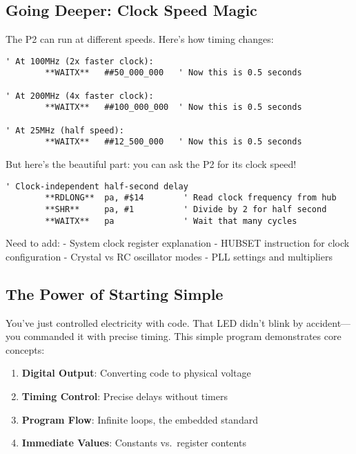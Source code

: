 \documentclass[11pt]{book}
\providecommand{\tightlist}{%
  \setlength{\itemsep}{0pt}\setlength{\parskip}{0pt}}
\begin{document}
\hypertarget{going-deeper-clock-speed-magic}{%
\subsection{Going Deeper: Clock Speed
Magic}\label{going-deeper-clock-speed-magic}}

The P2 can run at different speeds. Here's how timing changes:

\begin{lstlisting}
' At 100MHz (2x faster clock):
        **WAITX**   ##50_000_000   ' Now this is 0.5 seconds

' At 200MHz (4x faster clock):  
        **WAITX**   ##100_000_000  ' Now this is 0.5 seconds

' At 25MHz (half speed):
        **WAITX**   ##12_500_000   ' Now this is 0.5 seconds
\end{lstlisting}

But here's the beautiful part: you can ask the P2 for its clock speed!

\begin{lstlisting}
' Clock-independent half-second delay
        **RDLONG**  pa, #$14        ' Read clock frequency from hub
        **SHR**     pa, #1          ' Divide by 2 for half second
        **WAITX**   pa              ' Wait that many cycles
\end{lstlisting}

\begin{missing}
Need to add:
- System clock register explanation
- HUBSET instruction for clock configuration  
- Crystal vs RC oscillator modes
- PLL settings and multipliers
\end{missing}

\hypertarget{the-power-of-starting-simple}{%
\subsection{The Power of Starting
Simple}\label{the-power-of-starting-simple}}

You've just controlled electricity with code. That LED didn't blink by
accident---you commanded it with precise timing. This simple program
demonstrates core concepts:

\begin{enumerate}
\def\labelenumi{\arabic{enumi}.}
\tightlist
\item
  \textbf{Digital Output}: Converting code to physical voltage
\item
  \textbf{Timing Control}: Precise delays without timers
\item
  \textbf{Program Flow}: Infinite loops, the embedded standard
\item
  \textbf{Immediate Values}: Constants vs.~register contents
\end{enumerate}
\end{document}
